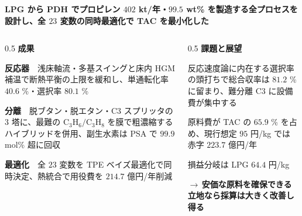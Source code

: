 \begin{frame}[t]

  \vspace{0.4em}
  {\bfseries\large LPG から PDH でプロピレン $402$ kt/年・$99.5$ wt\% を製造する全プロセスを設計し、全 $23$ 変数の同時最適化で TAC を最小化した}\par

  \vspace{0.7em}

  \begin{columns}[T,onlytextwidth]
    \begin{column}{0.5\textwidth}
      {\bfseries 成果}\par
      \vspace{0.3em}
      {\footnotesize\raggedright
        \textbf{反応器}　浅床軸流・多基スイングと床内 HGM 補温で断熱平衡の上限を緩和し、単通転化率 $40.6$ \%・選択率 $80.1$ \%\par
        \vspace{0.4em}
        \textbf{分離}　脱ブタン・脱エタン・C3 スプリッタの $3$ 塔に、最難の $\mathrm{C_3H_6}/\mathrm{C_3H_8}$ を膜で粗濃縮するハイブリッドを併用、副生水素は PSA で $99.9$ mol\% 超に回収\par
        \vspace{0.4em}
        \textbf{最適化}　全 $23$ 変数を TPE ベイズ最適化で同時決定、熱統合で用役費を $214.7$ 億円/年削減\par}
    \end{column}

    \begin{column}{0.5\textwidth}
      {\bfseries 課題と展望}\par
      \vspace{0.3em}
      {\footnotesize\raggedright
        反応速度論に内在する選択率の頭打ちで総合収率は $81.2$ \% に留まり、難分離 C3 に設備費が集中する\par
        \vspace{0.4em}
        原料費が TAC の $65.9$ \% を占め、現行想定 $95$ 円/kg では\,{\boldmath\color{SpRed}赤字 $223.7$ 億円/年}\par
        \vspace{0.4em}
        損益分岐は LPG $64.4$ 円/kg\par
        $\to$\,\textbf{安価な原料を確保できる立地なら採算は大きく改善し得る}\par}
    \end{column}
  \end{columns}


\end{frame}
